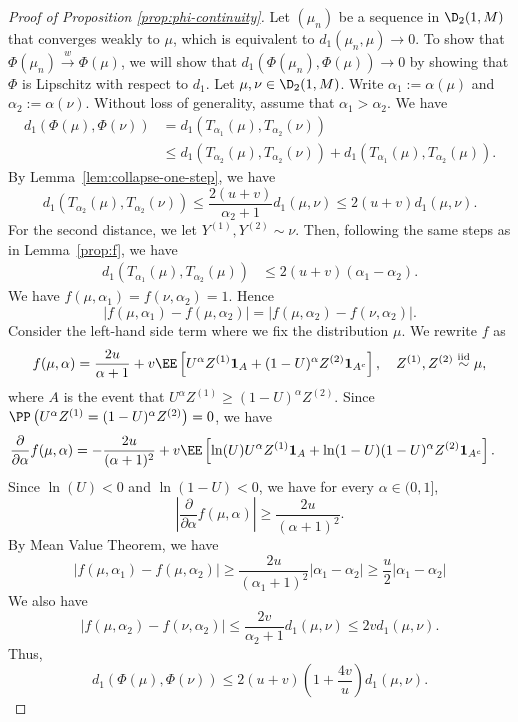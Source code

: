 \begin{proof}[Proof of Proposition \ref{prop:phi-continuity}]
  Let $(\mu_n)$ be a sequence in $\D_2(1, M)$ that converges weakly to $\mu$, which is equivalent to $d_1(\mu_n, \mu) \to 0$. To show that $\Phi(\mu_n)\stackrel{w}{\longrightarrow}\Phi(\mu)$, we will show that $d_1(\Phi(\mu_n), \Phi(\mu)) \to 0$ by showing that $\Phi$ is Lipschitz with respect to $d_1$. Let $\mu, \nu \in \D_2(1, M)$. Write $\alpha_1 := \alpha(\mu)$ and $\alpha_2 := \alpha(\nu)$. Without loss of generality, assume that $\alpha_1 > \alpha_2$. We have
  \begin{align*}
    d_1(\Phi(\mu), \Phi(\nu))
     & = d_1(T_{\alpha_1}(\mu), T_{\alpha_2}(\nu))                                                \\
     & \le d_1(T_{\alpha_2}(\mu), T_{\alpha_2}(\nu)) + d_1(T_{\alpha_1}(\mu), T_{\alpha_2}(\mu)).
  \end{align*}
  By Lemma~\ref{lem:collapse-one-step}, we have
  $$d_1(T_{\alpha_2}(\mu), T_{\alpha_2}(\nu)) \le \dfrac{2(u+v)}{\alpha_2+1}d_1(\mu, \nu) \le 2(u+v) d_1(\mu, \nu).$$
  For the second distance, we let $Y^{(1)},Y^{(2)} \sim \nu$. Then, following the same steps as in Lemma~\ref{prop:f}, we have
  \begin{align*}
    d_1(T_{\alpha_1}(\mu), T_{\alpha_2}(\mu))
     & \le 2(u+v)(\alpha_1 - \alpha_2).
  \end{align*}
  We have $f(\mu, \alpha_1) = f(\nu, \alpha_2) = 1$. Hence
  $$|f(\mu, \alpha_1) - f(\mu, \alpha_2)| = |f(\mu, \alpha_2) - f(\nu, \alpha_2)|.$$
  Consider the left-hand side term where we fix the distribution $\mu$. We rewrite $f$ as
  $$f(\mu, \alpha) = \dfrac{2u}{\alpha+1} + v\EE\left[U^\alpha Z^{(1)}\bm{1}_{A} + (1-U)^\alpha Z^{(2)}\bm{1}_{A^c}\right], \quad Z^{(1)}, Z^{(2)} \stackrel{\text{iid}}{\sim} \mu,$$
  where $A$ is the event that $U^\alpha Z^{(1)} \ge (1-U)^\alpha Z^{(2)}$. Since $\PP\left(U^\alpha Z^{(1)} = (1-U)^\alpha Z^{(2)}\right) = 0$, we have
  \begin{align*}
    \dfrac{\partial}{\partial \alpha} f(\mu, \alpha)
     & = -\dfrac{2u}{(\alpha+1)^2} + v\EE\left[\ln(U) U^\alpha Z^{(1)} \mathbf{1}_A + \ln(1-U) (1-U)^\alpha Z^{(2)} \mathbf{1}_{A^c}\right].
  \end{align*}
  Since $\ln(U) < 0$ and $\ln(1-U) < 0$, we have for every $\alpha\in(0,1]$,
  $$\left|\dfrac{\partial}{\partial \alpha} f(\mu, \alpha)\right| \ge \dfrac{2u}{(\alpha+1)^2}.$$
  By Mean Value Theorem, we have
  $$|f(\mu, \alpha_1) - f(\mu, \alpha_2)| \ge \dfrac{2u}{(\alpha_1+1)^2}|\alpha_1 - \alpha_2|\ge \dfrac{u}{2}|\alpha_1 - \alpha_2|$$
  We also have
  $$|f(\mu, \alpha_2) - f(\nu, \alpha_2)| \le \dfrac{2v}{\alpha_2+1}d_1(\mu, \nu) \le 2v d_1(\mu, \nu).$$
  Thus,
  $$d_1(\Phi(\mu), \Phi(\nu)) \le 2(u+v)\left(1+\dfrac{4v}{u}\right)d_1(\mu, \nu).$$
\end{proof}
